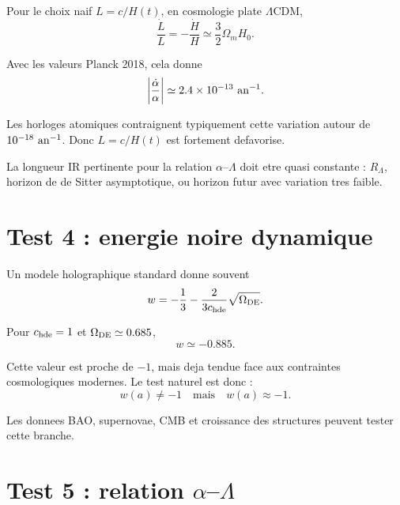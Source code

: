 \documentclass[11pt,a4paper]{article}
\begin{document}
Pour le choix naif \(L=c/H(t)\), en cosmologie plate \(\Lambda\)CDM,
\begin{equation}
\frac{\dot L}{L}=-\frac{\dot H}{H}
\simeq\frac32\Omega_m H_0.
\end{equation}

Avec les valeurs Planck 2018, cela donne
\begin{equation}
\left|\frac{\dot\alpha}{\alpha}\right|
\simeq2.4\times10^{-13}\ {\rm an}^{-1}.
\end{equation}

Les horloges atomiques contraignent typiquement cette variation autour de
\(10^{-18}\ {\rm an}^{-1}\). Donc \(L=c/H(t)\) est fortement defavorise.

\begin{tcolorbox}[colback=yellow!4!white,colframe=yellow!50!black,title=Conclusion]
La longueur IR pertinente pour la relation \(\alpha\)--\(\Lambda\) doit etre
quasi constante : \(R_\Lambda\), horizon de de Sitter asymptotique, ou horizon
futur avec variation tres faible.
\end{tcolorbox}

\section{Test 4 : energie noire dynamique}

Un modele holographique standard donne souvent
\begin{equation}
w=-\frac13-\frac{2}{3c_{\rm hde}}\sqrt{\Omega_{\rm DE}}.
\end{equation}

Pour \(c_{\rm hde}=1\) et \(\Omega_{\rm DE}\simeq0.685\),
\begin{equation}
w\simeq -0.885.
\end{equation}

Cette valeur est proche de \(-1\), mais deja tendue face aux contraintes
cosmologiques modernes. Le test naturel est donc :
\begin{equation}
w(a)\neq -1
\quad\text{mais}\quad
w(a)\approx -1.
\end{equation}

Les donnees BAO, supernovae, CMB et croissance des structures peuvent tester
cette branche.

\section{Test 5 : relation \texorpdfstring{\(\alpha\)--\(\Lambda\)}{alpha--Lambda}}
\end{document}
